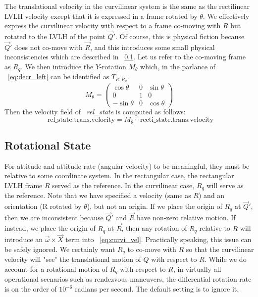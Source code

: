 The translational velocity in the curvilinear system is the same as the
rectilinear LVLH velocity except that it is expressed in a frame rotated by
$\theta$. We effectively express the curvilinear velocity 
with respect to a frame co-moving with $R$ but rotated to the LVLH of the
point $\vec Q'$. Of course, this is physical fiction because $\vec Q'$ does
not co-move with $\vec R$, and this introduces some small physical
inconsistencies which are described in ~\ref{subsec:rot}. Let us refer to the
co-moving frame as $R_q$. We then introduce the $Y$-rotation $M_\theta$ which,
in the parlance of ~\ref{eq:decr_left} can be identified as $T_{R:R_q}$.
\begin{equation}
M_\theta = \left (\begin{array}{ccc}
\cos \theta & 0 & \sin \theta \\
0 & 1 & 0 \\
-\sin \theta & 0 & \cos \theta \end{array} \right )
\label{eq:m_theta}
\end{equation}
Then the velocity field of \textit{~rel\_state} is computed as follows:
\begin{equation}
\mbox{~rel\_state.trans.velocity} = M_\theta \cdot \mbox{~recti\_state.trans.velocity}
\label{eq:curvi_vel}
\end{equation}

\subsection{Rotational State}\label{subsec:rot}
For attitude and attitude rate (angular velocity) to be meaningful,
they must be relative to some coordinate system. In the rectangular case, the
rectangular LVLH frame $R$ served as the reference. In the curvilinear case,
$R_q$ will serve as the reference. Note that we have specified
a velocity (same as $R$) and an orientation (R rotated by $\theta$), but not an
origin. If we place the origin of $R_q$ at $\vec Q'$, then we are inconsistent
because $\vec Q'$ and $\vec R$ have non-zero relative motion. If instead, we
place the origin of $R_q$ at $\vec R$, then any rotation of $R_q$ relative to
$R$ will introduce an $\vec\omega \times \vec X$ term into ~\ref{eq:curvi_vel}.
Practically speaking, this issue can be safely ignored. We certainly want
$R_q$ to co-move with $R$ so that the curvilinear velocity will "see" the
translational motion of $Q$ with respect to $R$. While we do account for a
rotational motion of $R_q$ with respect to $R$, in virtually all
operational scenarios such as rendezvous maneuvers, the differential rotation
rate is on the order of $10^{-6}$ radians per second. The default setting is
to ignore it.

